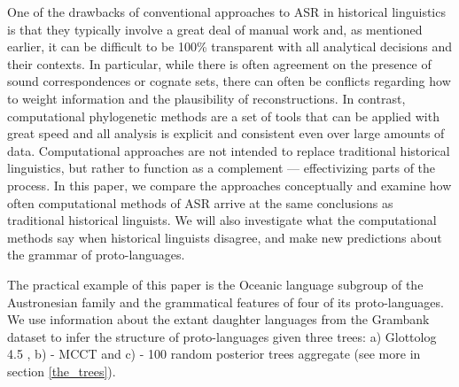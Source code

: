 \documentclass[12pt,letterpaper]{article}
\begin{document}
One of the drawbacks of conventional approaches to ASR in historical linguistics is that they typically involve a great deal of manual work and, as mentioned earlier, it can be difficult to be 100\% transparent with all analytical decisions and their contexts. In particular, while there is often agreement on the presence of sound correspondences or cognate sets, there can often be conflicts regarding how to weight information and the plausibility of reconstructions. In contrast, computational phylogenetic methods are a set of tools that can be applied with great speed and all analysis is explicit and consistent even over large amounts of data. Computational approaches are not intended to replace traditional historical linguistics, but rather to function as a complement --- effectivizing parts of the process. In this paper, we compare the approaches conceptually and
examine how often computational methods of ASR arrive at the same conclusions as traditional historical linguists. We will also investigate what the computational methods say when historical linguists disagree, and make new predictions about the grammar of proto-languages.



The practical example of this paper is the Oceanic language subgroup of the Austronesian family and the grammatical features of four of its proto-languages. We use information about the extant daughter languages from the Grambank dataset \citep{grambank_release} to infer the structure of proto-languages given three trees: a) Glottolog 4.5 \citep{glottolog4_5}, b)\citet{grayetal_2009} - MCCT and c) \citet{grayetal_2009} - 100 random posterior trees aggregate (see more in section \ref{the_trees}). 
\end{document}
